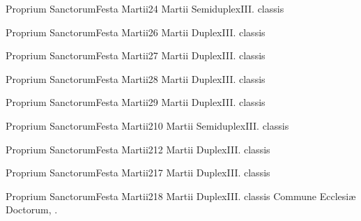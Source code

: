 \documentclass[nocturnale-romanum.tex]{subfiles}
\begin{document}

	{Proprium Sanctorum}{Festa Martii}{2}{4 Martii}
	{Semiduplex}{III. classis}
	{}
	{}

	{Proprium Sanctorum}{Festa Martii}{2}{6 Martii}
	{Duplex}{III. classis}
	{}
	{}

	{Proprium Sanctorum}{Festa Martii}{2}{7 Martii}
	{Duplex}{III. classis}
	{}
	{}

	{Proprium Sanctorum}{Festa Martii}{2}{8 Martii}
	{Duplex}{III. classis}
	{}
	{}

	{Proprium Sanctorum}{Festa Martii}{2}{9 Martii}
	{Duplex}{III. classis}
	{}
	{}

	{Proprium Sanctorum}{Festa Martii}{2}{10 Martii}
	{Semiduplex}{III. classis}
	{}
	{}

	{Proprium Sanctorum}{Festa Martii}{2}{12 Martii}
	{Duplex}{III. classis}
	{}
	{}

	{Proprium Sanctorum}{Festa Martii}{2}{17 Martii}
	{Duplex}{III. classis}
	{}
	{}

	{Proprium Sanctorum}{Festa Martii}{2}{18 Martii}
	{Duplex}{III. classis}
	{Commune Ecclesiæ Doctorum, \pageref{M-CODO}.}
	{}
\end{document}
